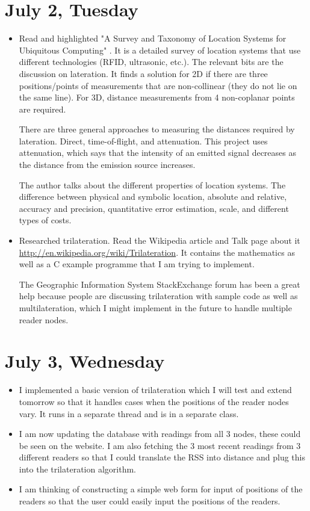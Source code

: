 \documentclass[a4paper,12pt]{article}
\begin{document}
\section{July 2, Tuesday}

\begin{itemize}
	\item Read and highlighted "A Survey and Taxonomy of Location Systems for Ubiquitous Computing" \cite{Hightower2001c}. It is a detailed survey of location systems that use different technologies (RFID, ultrasonic, etc.). The relevant bits are the discussion on lateration. It finds a solution for 2D if there are three positions/points of measurements that are non-collinear (they do not lie on the same line). For 3D, distance measurements from 4 non-coplanar points are required.
	
	There are three general approaches to measuring the distances required by lateration. Direct, time-of-flight, and attenuation. This project uses attenuation, which says that the intensity of an emitted signal decreases as the distance from the emission source increases.
	
	The author talks about the different properties of location systems. The difference between physical and symbolic location, absolute and relative, accuracy and precision, quantitative error estimation, scale, and different types of costs.
	\item Researched trilateration. Read the Wikipedia article and Talk page about it \url{http://en.wikipedia.org/wiki/Trilateration}. It contains the mathematics as well as a C example programme that I am trying to implement.
	
	The Geographic Information System StackExchange forum has been a great help because people are discussing trilateration with sample code as well as multilateration, which I might implement in the future to handle multiple reader nodes.
\end{itemize}

\section{July 3, Wednesday}

\begin{itemize}
	\item I implemented a basic version of trilateration which I will test and extend tomorrow so that it handles cases when the positions of the reader nodes vary. It runs in a separate thread and is in a separate class.
	\item I am now updating the database with readings from all 3 nodes, these could be seen on the website. I am also fetching the 3 most recent readings from 3 different readers so that I could translate the RSS into distance and plug this into the trilateration algorithm.
	\item I am thinking of constructing a simple web form for input of positions of the readers so that the user could easily input the positions of the readers.
\end{itemize}
\end{document}
